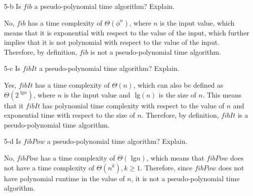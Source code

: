 \documentclass[11pt]{article}
\newcommand{\tlg}{\text{ lg}}
\begin{document}
\begin{prob}{5-b}
Is $fib$ a pseudo-polynomial time algorithm? Explain.
\end{prob}
\begin{sol}

No, $fib$ has a time complexity of $\Theta(\phi^{n})$, where $n$ is the input value, which means that it is exponential with respect to the value of the input, which further implies that it is not polynomial with respect to the value of the input. Therefore, by definition, $fib$ is not a pseudo-polynomial time algorithm.
\end{sol}

\begin{prob}{5-c}
Is $fibIt$ a pseudo-polynomial time algorithm? Explain.
\end{prob}
\begin{sol}

Yes, $fibIt$ has a time complexity of $\Theta(n)$, which can also be defined as $\Theta(2^{\tlg n})$, where $n$ is the input value and $\tlg (n)$ is the size of $n$. This means that it $fibIt$ has polynomial time complexity with respect to the value of $n$ and exponential time with respect to the size of $n$. Therefore, by definition, $fibIt$ is a pseudo-polynomial time algorithm.
\end{sol}

\begin{prob}{5-d}
Is $fibPow$ a pseudo-polynomial time algorithm? Explain.
\end{prob}
\begin{sol}

No, $fibPow$ has a time complexity of $\Theta(\tlg n)$, which means that $fibPow$ does not have a time complexity of $\Theta(n^{k}), k \geq 1$. Therefore, since $fibPow$ does not have polynomial runtime in the value of $n$, it is not a pseudo-polynomial time algorithm.


\end{sol}
\end{document}
